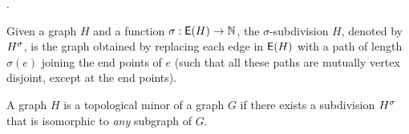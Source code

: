 \documentclass[11pt]{article}
\begin{document}
.
\begin{definition}\label{def:subdivisions}
Given a graph $H$ and a function $\sigma: \mathsf{E}(H) \rightarrow \mathbb{N}$, the $\sigma$-subdivision $H$, denoted by ${H}^{\sigma}$, is the graph obtained by replacing each edge in $\mathsf{E}(H)$ with a path of length $\sigma(e)$ joining the end points of $e$ (such that all these paths are mutually vertex disjoint, except at the end points).	
\end{definition}

\begin{definition}\label{def:topological-minor}
A graph $H$ is a topological minor of a graph $G$ if there exists a subdivision ${H}^{\sigma}$ that is isomorphic to \emph{any} subgraph of $G$.	
\end{definition}
\end{document}
